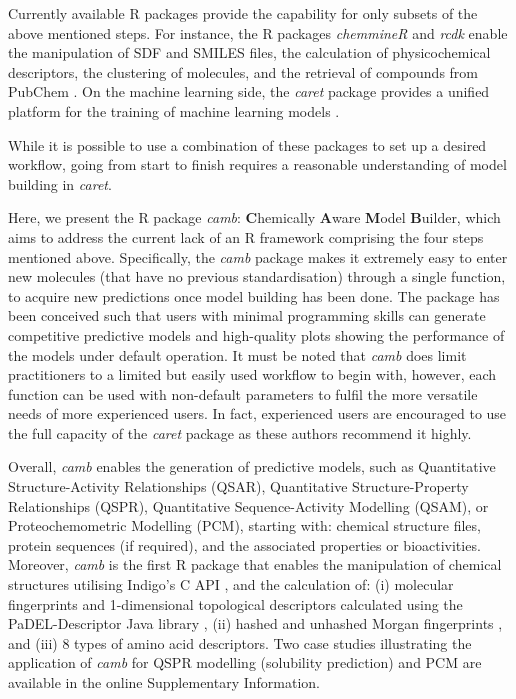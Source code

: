 \documentclass{bmcart}
\begin{document}
Currently available R packages provide the capability for only subsets of the above mentioned steps.
For instance, the R packages {\it chemmineR} \cite{chemmineR} and {\it rcdk} \cite{rcdk} enable the manipulation of SDF and SMILES
files, the calculation of physicochemical descriptors, the clustering of molecules,
and the retrieval of compounds from PubChem \cite{pubchem}.
On the machine learning side, the {\it caret} package provides a
unified platform for the training of machine learning models \cite{caret}.

While it is possible to use a combination of these packages to set up a desired workflow, going from start to finish requires a reasonable understanding of model building in {\it caret}. 

Here, we present the R package {\it camb}: {\bf C}hemically {\bf A}ware {\bf M}odel {\bf B}uilder, which aims to address the current lack of an R framework comprising the four steps mentioned above. 
Specifically, the {\it camb} package makes it extremely easy to enter new molecules (that have no previous standardisation) through a single function, to acquire new predictions once model building has been done.
The package has been conceived such that users with minimal programming skills can generate competitive predictive models and high-quality plots showing the performance of the models under default operation.
It must be noted that {\it camb} does limit practitioners to a limited but easily used workflow to begin with, however, each function can be used with non-default parameters to fulfil the more versatile needs of more experienced users. 
In fact, experienced users are encouraged to use the full capacity of the {\it caret} package as these authors recommend it highly.

Overall, {\it camb} enables the generation of predictive  models,
such as 
Quantitative Structure-Activity Relationships (QSAR), 
Quantitative Structure-Property Relationships (QSPR), 
Quantitative Sequence-Activity Modelling (QSAM), 
or Proteochemometric Modelling (PCM),
starting with: chemical structure files, protein sequences (if required), and the associated properties or bioactivities.
Moreover, {\it camb} is the first R package that enables the manipulation of chemical structures utilising Indigo's C API \cite{Indigo},
and the calculation of:
(i) molecular fingerprints and 1-dimensional \cite{Rognan} topological 
descriptors calculated using the PaDEL-Descriptor Java library \cite{padel},
(ii) hashed and unhashed Morgan fingerprints \cite{extended_fp},
and (iii) 8 types of amino acid descriptors. 
Two case studies illustrating the application of {\it camb} for
QSPR modelling (solubility prediction) and PCM are available in the online Supplementary Information.
\end{document}
